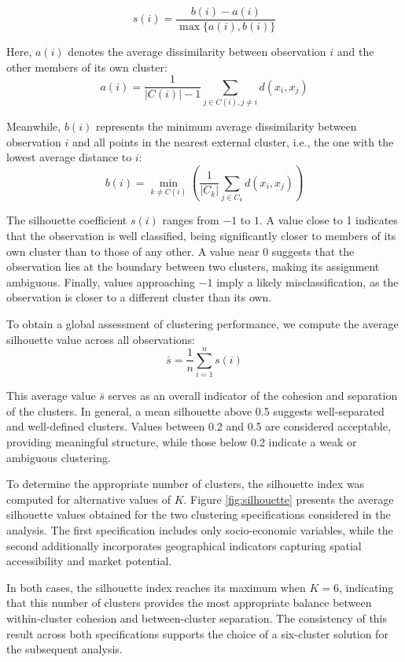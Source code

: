 \documentclass[a4paper,11pt,oneside]{article}
\begin{document}
\[
s(i) = \frac{b(i) - a(i)}{\max\{a(i), b(i)\}}
\]

Here, \(a(i)\) denotes the average dissimilarity between observation \(i\) and the other members of its own cluster:
\[
a(i) = \frac{1}{|C(i)| - 1} \sum_{j \in C(i), j \ne i} d(x_i, x_j)
\]

Meanwhile, \(b(i)\) represents the minimum average dissimilarity between observation \(i\) and all points in the nearest external cluster, i.e., the one with the lowest average distance to \(i\):
\[
b(i) = \min_{k \ne C(i)} \left( \frac{1}{|C_k|} \sum_{j \in C_k} d(x_i, x_j) \right)
\]

The silhouette coefficient \(s(i)\) ranges from \(-1\) to \(1\). A value close to 1 indicates that the observation is well classified, being significantly closer to members of its own cluster than to those of any other. A value near 0 suggests that the observation lies at the boundary between two clusters, making its assignment ambiguous. Finally, values approaching \(-1\) imply a likely misclassification, as the observation is closer to a different cluster than its own.

To obtain a global assessment of clustering performance, we compute the average silhouette value across all observations:
\begin{equation}
    \label{eq:eq28}
    \bar{s} = \frac{1}{n} \sum_{i=1}^{n} s(i)
\end{equation}

This average value \(\bar{s}\) serves as an overall indicator of the cohesion and separation of the clusters. In general, a mean silhouette above 0.5 suggests well-separated and well-defined clusters. Values between 0.2 and 0.5 are considered acceptable, providing meaningful structure, while those below 0.2 indicate a weak or ambiguous clustering.

To determine the appropriate number of clusters, the silhouette index was computed for alternative values of $K$. Figure \ref{fig:silhouette}  presents the average silhouette values obtained for the two clustering specifications considered in the analysis. The first specification includes only socio-economic variables, while the second additionally incorporates geographical indicators capturing spatial accessibility and market potential.

In both cases, the silhouette index reaches its maximum when $K=6$, indicating that this number of clusters provides the most appropriate balance between within-cluster cohesion and between-cluster separation. The consistency of this result across both specifications supports the choice of a six-cluster solution for the subsequent analysis.
\end{document}
